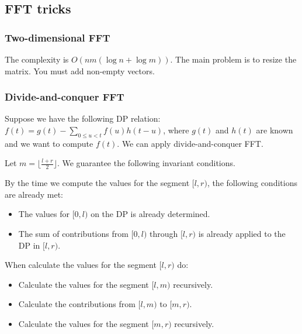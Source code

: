 \subsection{FFT tricks}
\subsubsection{Two-dimensional FFT}
The complexity is $O(nm(\log n + \log m))$.
The main problem is to resize the matrix. You must add non-empty vectors.

\subsubsection{Divide-and-conquer FFT}
Suppose we have the following DP relation: $f(t) = g(t) - \sum_{0 \le u < t} f(u) h(t-u)$,
where $g(t)$ and $h(t)$ are known and we want to compute $f(t)$. We can apply divide-and-conquer FFT.

Let $m = \lfloor\frac{l+r}{2}\rfloor$. We guarantee the following invariant conditions.

By the time we compute the values for the segment $[l,r)$, the following conditions are already met:
\begin{itemize}
\item The values for $[0,l)$ on the DP is already determined.
\item The sum of contributions from $[0,l)$ through $[l,r)$ is already applied to the DP in $[l,r)$.
\end{itemize}

When calculate the values for the segment $[l, r)$ do:
\begin{itemize}
\item Calculate the values for the segment $[l,m)$ recursively.
\item Calculate the contributions from $[l,m)$ to $[m,r)$.
\item Calculate the values for the segment $[m,r)$ recursively.
\end{itemize}

